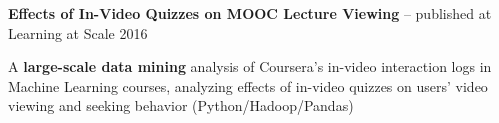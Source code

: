 \documentclass[margin,line]{resume}
\begin{document}
\begin{resume}
\vspace{-2mm}






\textbf{Effects of In-Video Quizzes on MOOC Lecture Viewing} -- published at Learning at Scale 2016
\begin{compactitem}
\item A \textbf{large-scale data mining} analysis of Coursera's in-video interaction logs in Machine Learning courses, analyzing effects of in-video quizzes on users' video viewing and seeking behavior (Python/Hadoop/Pandas)
\end{compactitem}

\vspace{-2mm}


\end{resume}
\end{document}
